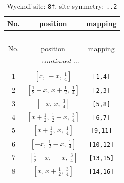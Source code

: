 \documentclass[fleqn,8pt]{jsarticle}
\begin{document}
\begin{longtable}{ccc}
\caption{Wyckoff site: {\tt 8f}, site symmetry: {\tt ..2}}
 \\
 \hline \hline
No. & position & mapping \\ \hline \endfirsthead

\multicolumn{2}{l}{\tablename\ \thetable{}} \\
 \hline \hline
No. & position & mapping \\ \hline \endhead

 \hline \hline
\multicolumn{2}{r}{\footnotesize\it continued ...} \\ \endfoot

 \hline \hline
\multicolumn{2}{r}{} \\ \endlastfoot

1 & $\left[ x,\, - x,\, \frac{1}{4} \right]$ & {\tt [1,4]} \\ \hline
2 & $\left[ \frac{1}{2} - x,\, x + \frac{1}{2},\, \frac{1}{4} \right]$ & {\tt [2,3]} \\ \hline
3 & $\left[ - x,\, x,\, \frac{3}{4} \right]$ & {\tt [5,8]} \\ \hline
4 & $\left[ x + \frac{1}{2},\, \frac{1}{2} - x,\, \frac{3}{4} \right]$ & {\tt [6,7]} \\ \hline
5 & $\left[ x + \frac{1}{2},\, x,\, \frac{1}{4} \right]$ & {\tt [9,11]} \\ \hline
6 & $\left[ - x,\, \frac{1}{2} - x,\, \frac{1}{4} \right]$ & {\tt [10,12]} \\ \hline
7 & $\left[ \frac{1}{2} - x,\, - x,\, \frac{3}{4} \right]$ & {\tt [13,15]} \\ \hline
8 & $\left[ x,\, x + \frac{1}{2},\, \frac{3}{4} \right]$ & {\tt [14,16]} \\
\end{longtable}
\renewcommand{\arraystretch}{1.2}
\end{document}
